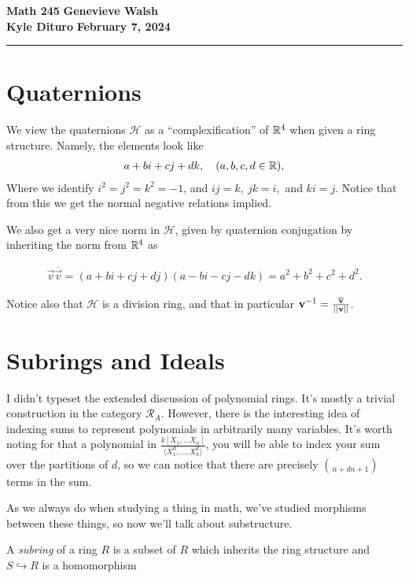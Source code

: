 \documentclass[12pt, twosided]{article}
\begin{document}
\noindent \textbf{Math 245} \hfill \textbf{Genevieve Walsh} \\
\textbf{Kyle Dituro} \hfill \textbf{February 7\tht, 2024}\hrule
\vspace{.2in}

\section{Quaternions}

We view the quaternions \(\mathcal{H}\) as a ``complexification'' of \(\mathbb{R}^4\) when given a ring structure. Namely, the elements look like
\begin{align*}
  a + bi + cj + dk, \quad (a,b,c,d \in \mathbb{R}),
\end{align*}
Where we identify \(i^2 = j^2 = k^2 = -1\), and \( ij = k,\ jk = i,\) and \(ki = j\). Notice that from this we get the normal negative relations implied.

We also get a very nice norm in \(\mathcal{H}\), given by quaternion conjugation by inheriting the norm from \(\mathbb{R}^4\) as

\begin{align*}
  \vec v \overline{\vec v} = (a + bi + cj + dj)(a -bi -cj - dk) = a^2 + b^2 + c^2 + d^2.
\end{align*}

Notice also that \(\mathcal{H}\) is a division ring, and that in particular \(\mathbf{v}^{-1} = \frac{\overline{\mathbf{v}}}{||\mathbf{v}||}\).

\section{Subrings and Ideals}
\begin{note}
  I didn't typeset the extended discussion of polynomial rings. It's mostly a trivial construction in the category \(\mathcal{R}_A\). However, there is the interesting idea of indexing sums to represent polynomials in arbitrarily many variables. It's worth noting for that a polynomial in \(\frac{k[X_1, \ldots X_n]}{\langle X_1^d, \ldots, X_n^d \rangle}\), you will be able to index your sum over the partitions of \(d\), so we can notice that there are precisely \(\choose{n + d}{n + 1}\) terms in the sum. 
\end{note}

As we always do when studying a thing in math, we've studied morphisms between these things, so now we'll talk about substructure.
\begin{df}
  A \textit{subring} of a ring \(R\) is a subset of \(R\) which inherits the ring structure and \(S \hookrightarrow R\) is a homomorphism
\end{df}
\end{document}

